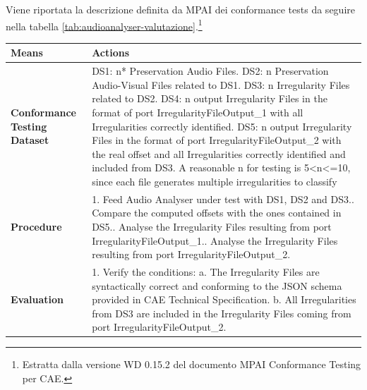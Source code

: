 Viene riportata la descrizione definita da \ac{MPAI} dei conformance tests da seguire nella tabella \ref{tab:audioanalyser-valutazione}.\footnote{Estratta dalla versione WD 0.15.2 del documento MPAI Conformance Testing per \ac{CAE}.}

\begin{spacing}{1.1}
\begin{table}[H]
    \centering
    \begin{tabular}{|p{}|p{}|}
        \hline
        \textbf{Means}   &   \textbf{Actions}\\
        \hline
        \textbf{Conformance Testing Dataset}    &
            DS1: n* Preservation Audio Files.\newline
            DS2: n Preservation Audio-Visual Files related to DS1.\newline
            DS3: n Irregularity Files related to DS2.\newline
            DS4: n output Irregularity Files in the format of port IrregularityFileOutput\_1 with all Irregularities correctly identified.\newline
            DS5: n output Irregularity Files in the format of port IrregularityFileOutput\_2 with the real offset and all Irregularities correctly identified and included from DS3.\newline
            \newline
            \footnotesize* A reasonable n for testing is 5<n<=10, since each file generates multiple irregularities to classify\\
        \hline
        \textbf{Procedure}  &
            1.	Feed Audio Analyser under test with DS1, DS2 and DS3.\newline
            2.	Compare the computed offsets with the ones contained in DS5.\newline
            3.	Analyse the Irregularity Files resulting from port IrregularityFileOutput\_1.\newline
            4.	Analyse the Irregularity Files resulting from port IrregularityFileOutput\_2.\\
        \hline
        \textbf{Evaluation} &
            	1.	Verify the conditions:\newline
            	   a.	The Irregularity Files are syntactically correct and conforming to the JSON schema provided in CAE Technical Specification.\newline
            	   b.	All Irregularities from DS3 are included in the Irregularity Files coming from port IrregularityFileOutput\_2.\newline

\end{tabular}
\end{table}
\end{spacing}
